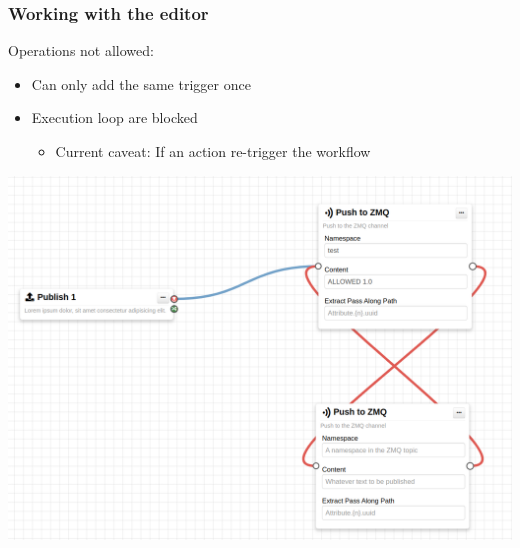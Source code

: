 \begin{frame}
    \frametitle{Working with the editor}
    Operations not allowed:
    \begin{itemize}
        \item Can only add the same trigger once
        \item Execution loop are blocked
        \begin{itemize}
            \item Current caveat: If an action re-trigger the workflow
        \end{itemize}
    \end{itemize}
    \begin{center}
        \includegraphics[width=0.7\linewidth]{pictures/editor-not-allowed-1.png}
    \end{center}
\end{frame}

